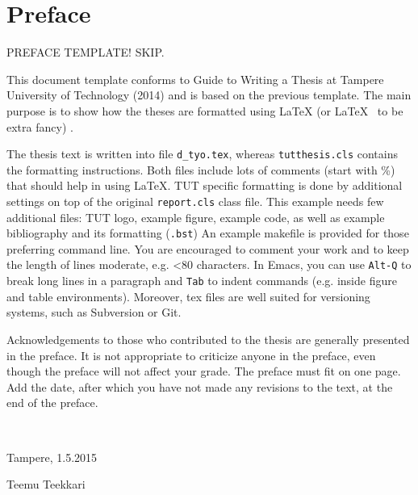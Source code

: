 \documentclass[12pt,a4paper,english]{tutthesis}
\begin{document}
\makeatother %

%
%
\chapter*{Preface}

PREFACE TEMPLATE! SKIP.

This document template conforms to Guide to Writing a Thesis at
Tampere University of Technology (2014) and is based on the previous
template. The main purpose is to show how the theses are formatted
using LaTeX (or \LaTeX ~ to be extra fancy) .


The thesis text is written into file \texttt{d\_tyo.tex}, whereas
\texttt{tutthesis.cls} contains the formatting instructions. Both
files include lots of comments (start with \%) that should help in
using LaTeX. TUT specific formatting is done by additional settings on
top of the original \texttt{report.cls} class file. This example needs
few additional files: TUT logo, example figure, example code, as well
as example bibliography and its formatting (\texttt{.bst}) An example
makefile is provided for those preferring command line. You are
encouraged to comment your work and to keep the length of lines
moderate, e.g. <80 characters. In Emacs, you can use \texttt{Alt-Q} to
break long lines in a paragraph and \texttt{Tab} to indent commands
(e.g. inside figure and table environments). Moreover, tex files are
well suited for versioning systems, such as Subversion or Git.  

Acknowledgements to those who contributed to the thesis are generally
presented in the preface. It is not appropriate to criticize anyone in
the preface, even though the preface will not affect your grade. The
preface must fit on one page. Add the date, after which you have not
made any revisions to the text, at the end of the preface.

~ 

Tampere, 1.5.2015
~


Teemu Teekkari
%
%
\end{document}
